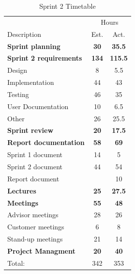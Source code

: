 \begin{table}[!htb] \small \center
\caption{Sprint 2 Timetable\label{tab:sprint2time}}
\begin{tabularx}{\textwidth}{X c c}
	\toprule
	& \multicolumn{2}{c}{Hours} \\
	\cmidrule(r){2-3}
	Description & Est. & Act. \\
	\midrule
	\textbf{Sprint planning} & \textbf{30} & \textbf{35.5} \\
	\addlinespace
	\textbf{Sprint 2 requirements} & \textbf{134} & \textbf{115.5} \\
	Design & 8 & 5.5 \\
	Implementation & 44 & 43 \\
	Testing & 46 & 35 \\
	User Documentation & 10 & 6.5 \\
	Other & 26 & 25.5 \\
	\addlinespace
	\textbf{Sprint review} & \textbf{20} & \textbf{17.5} \\
	\addlinespace
	\textbf{Report documentation} & \textbf{58} & \textbf{69} \\
	Sprint 1 document & 14 & 5 \\
	Sprint 2 document & 44 & 54 \\
	Report document & & 10 \\
	\addlinespace
	\textbf{Lectures} & \textbf{25} & \textbf{27.5} \\
	\addlinespace
	\textbf{Meetings} & \textbf{55} & \textbf{48} \\
	Advisor meetings & 28 & 26 \\
	Customer meetings & 6 & 8 \\
	Stand-up meetings & 21 & 14 \\
	\addlinespace
	\textbf{Project Managment} & \textbf{20} & \textbf{40} \\
	\midrule
	Total: & 342 & 353 \\
	\bottomrule
\end{tabularx}
\end{table}




